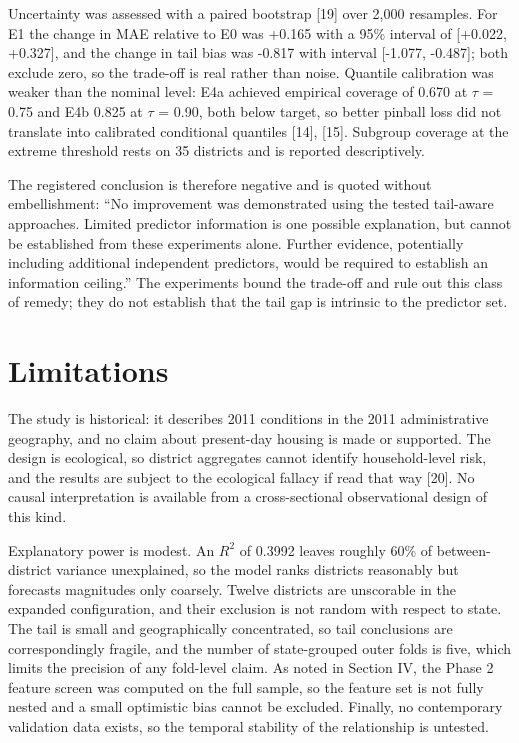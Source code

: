\documentclass[conference]{IEEEtran}
\begin{document}
Uncertainty was assessed with a paired bootstrap [19] over 2,000 resamples. For E1 the change in MAE relative to E0 was +0.165 with a 95\% interval of [+0.022, +0.327], and the change in tail bias was -0.817 with interval [-1.077, -0.487]; both exclude zero, so the trade-off is real rather than noise. Quantile calibration was weaker than the nominal level: E4a achieved empirical coverage of 0.670 at $\tau$ = 0.75 and E4b 0.825 at $\tau$ = 0.90, both below target, so better pinball loss did not translate into calibrated conditional quantiles [14], [15]. Subgroup coverage at the extreme threshold rests on 35 districts and is reported descriptively.

The registered conclusion is therefore negative and is quoted without embellishment: “No improvement was demonstrated using the tested tail-aware approaches. Limited predictor information is one possible explanation, but cannot be established from these experiments alone. Further evidence, potentially including additional independent predictors, would be required to establish an information ceiling.” The experiments bound the trade-off and rule out this class of remedy; they do not establish that the tail gap is intrinsic to the predictor set.

\section{Limitations}

The study is historical: it describes 2011 conditions in the 2011 administrative geography, and no claim about present-day housing is made or supported. The design is ecological, so district aggregates cannot identify household-level risk, and the results are subject to the ecological fallacy if read that way [20]. No causal interpretation is available from a cross-sectional observational design of this kind.

Explanatory power is modest. An $R^2$ of 0.3992 leaves roughly 60\% of between-district variance unexplained, so the model ranks districts reasonably but forecasts magnitudes only coarsely. Twelve districts are unscorable in the expanded configuration, and their exclusion is not random with respect to state. The tail is small and geographically concentrated, so tail conclusions are correspondingly fragile, and the number of state-grouped outer folds is five, which limits the precision of any fold-level claim. As noted in Section IV, the Phase 2 feature screen was computed on the full sample, so the feature set is not fully nested and a small optimistic bias cannot be excluded. Finally, no contemporary validation data exists, so the temporal stability of the relationship is untested.
\end{document}
